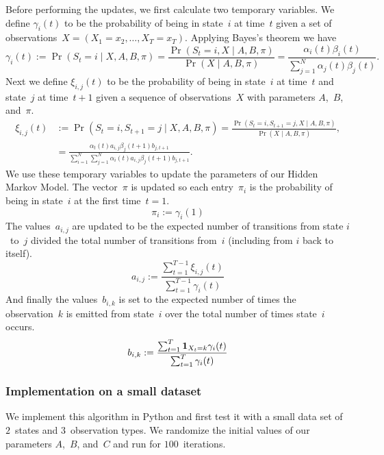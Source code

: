 \documentclass[twoside]{article}
\begin{document}
Before performing the updates, we first calculate two temporary variables.
We define $\gamma_i(t)$ to be the probability of being in state~$i$ at time~$t$ given a set of observations~${X = (X_1 = x_2, \ldots, X_T = x_T)}$.
Applying Bayes's theorem we have
\begin{equation*}
  \gamma_i(t) := \Pr(S_t = i \mid X, A, B, \pi) = \frac{\Pr(S_t = i, X \mid A, B, \pi)}{\Pr(X \mid A, B, \pi)} = \frac{\alpha_{i}(t) \beta_i(t)}{\sum_{j = 1}^N \alpha_j(t) \beta_j(t)}.
\end{equation*}
Next we define $\xi_{i, j}(t)$ to be the probability of being in state~$i$ at time~$t$ and state~$j$ at time~$t + 1$ given a sequence of observations~$X$ with parameters $A$,~$B$, and~$\pi$.
\begin{align*}
  \xi_{i, j}(t) &:= \Pr(S_t = i, S_{t+1} = j \mid X, A, B, \pi) = \frac{\Pr(S_t = i, S_{t+1} = j, X \mid A, B, \pi)}{\Pr(X \mid A, B, \pi)},\\
  &= \frac{\alpha_t(t) a_{i, j} \beta_j(t + 1) b_{j, t+1}}{\sum_{i=1}^N \sum_{j=1}^N \alpha_i(t) a_{i, j} \beta_j(t+1) b_{j, t+1}}.
\end{align*}
We use these temporary variables to update the parameters of our Hidden Markov Model.
The vector~$\pi$ is updated so each entry~$\pi_i$ is the probability of being in state~$i$ at the first time~${t = 1}$.
\begin{equation*}
  \pi_i := \gamma_i(1)
\end{equation*}
The values~$a_{i, j}$ are updated to be the expected number of transitions from state $i$~to~$j$ divided the total number of transitions from~$i$ (including from $i$ back to itself).
\begin{equation*}
  a_{i, j} := \frac{\sum_{t=1}^{T-1}\xi_{i, j}(t)}{\sum_{t=1}^{T-1}\gamma_i(t)}
\end{equation*}
And finally the values~$b_{i, k}$ is set to the expected number of times the observation~$k$ is emitted from state~$i$ over the total number of times state~$i$ occurs.
\begin{equation*}
  b_{i,k} := \frac{\sum_{t=1}^T \bm{\mathrm{1}}_{X_t = k}\gamma_i(t)}{\sum_{t=1}^T \gamma_i(t)}
\end{equation*}

\subsubsection{Implementation on a small dataset}\label{sec:impl-small-data}

We implement this algorithm in Python and first test it with a small data set of $2$~states and $3$~observation types.
We randomize the initial values of our parameters $A$,~$B$, and~$C$ and run for $100$~iterations.
\end{document}
